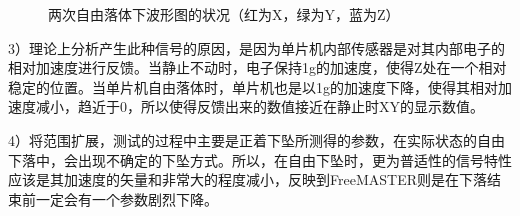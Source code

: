 \begin{figure}[htbp]
\centering

%
%

\centering
\caption{两次自由落体下波形图的状况（红为X，绿为Y，蓝为Z）}\label{fig:6.1.2}
\end{figure}

\par{3）理论上分析产生此种信号的原因，是因为单片机内部传感器是对其内部电子的相对加速度进行反馈。当静止不动时，电子保持1g的加速度，使得Z处在一个相对稳定的位置。当单片机自由落体时，单片机也是以1g的加速度下降，使得其相对加速度减小，趋近于0，所以使得反馈出来的数值接近在静止时XY的显示数值。}

\par{4）将范围扩展，测试的过程中主要是正着下坠所测得的参数，在实际状态的自由下落中，会出现不确定的下坠方式。所以，在自由下坠时，更为普适性的信号特性应该是其加速度的矢量和非常大的程度减小，反映到FreeMASTER则是在下落结束前一定会有一个参数剧烈下降。
}

